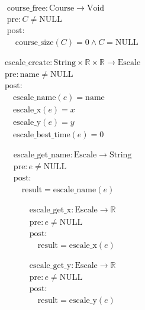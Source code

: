 \[
\begin{aligned}
&\text{course\_free}: \text{Course} \to \text{Void} \\
&\text{pre}: C \neq \text{NULL} \\
&\text{post}: \\
&\quad \text{course\_size}(C) = 0 \land C = \text{NULL}
\end{aligned}
\]


\[
\begin{aligned}
&\text{escale\_create}: \text{String} \times \mathbb{R} \times \mathbb{R} \to \text{Escale} \\
&\text{pre}: \text{name} \neq \text{NULL} \\
&\text{post}: \\
&\quad \text{escale\_name}(e) = \text{name} \\
&\quad \text{escale\_x}(e) = x \\
&\quad \text{escale\_y}(e) = y \\
&\quad \text{escale\_best\_time}(e) = 0
\end{aligned}
\]





\[
\begin{aligned}
&\text{escale\_get\_name}: \text{Escale} \to \text{String} \\
&\text{pre}: e \neq \text{NULL} \\
&\text{post}: \\
&\quad \text{result} = \text{escale\_name}(e)
\end{aligned}
\]





\[
\begin{aligned}
&\text{escale\_get\_x}: \text{Escale} \to \mathbb{R} \\
&\text{pre}: e \neq \text{NULL} \\
&\text{post}: \\
&\quad \text{result} = \text{escale\_x}(e)
\end{aligned}
\]





\[
\begin{aligned}
&\text{escale\_get\_y}: \text{Escale} \to \mathbb{R} \\
&\text{pre}: e \neq \text{NULL} \\
&\text{post}: \\
&\quad \text{result} = \text{escale\_y}(e)
\end{aligned}
\]





